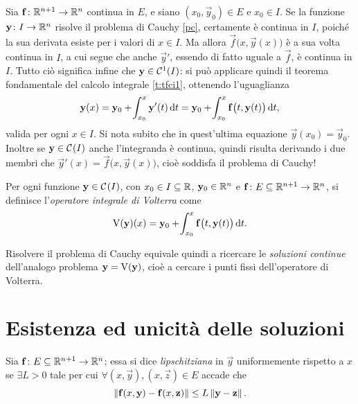 Sia $\mathbf{f}\colon\mathbb{R}^{n+1}\to\mathbb{R}^n$ continua in $E$, e siano $(x_0,\vec y_0)\in E$ e $x_0\in I$. Se la funzione $\mathbf{y}\colon I\to\mathbb{R}^n$ risolve il problema di Cauchy \eqref{pc}, certamente è continua in $I$, poiché la sua derivata esiste per i valori di $x\in I$. Ma allora $\vec f\big(x,\vec y(x)\big)$ è a sua volta continua in $I$, a cui segue che anche $\vec y'$, essendo di fatto uguale a $\vec f$, è continua in $I$. Tutto ciò significa infine che $\mathbf{y}\in\mathcal{C}^{{1}}(I)$: si può applicare quindi il teorema fondamentale del calcolo integrale \ref{t:tfci1}, ottenendo l'uguaglianza
\begin{equation}
\mathbf{y}(x)=\mathbf{y}_0+\!\int_{x_0}^x\mathbf{y}'(t)\,\textup{d} t=\mathbf{y}_0+\!\int_{x_0}^x\mathbf{f}\big(t,\mathbf{y}(t)\big)\,\textup{d} t,
\end{equation}
valida per ogni $x\in I$.
Si nota subito che in quest'ultima equazione $\vec y(x_0)=\vec y_0$. Inoltre se $\mathbf{y}\in\mathcal{C}^{{}}(I)$ anche l'integranda è continua, quindi risulta derivando i due membri che $\vec y'(x)=\vec f\big(x,\vec y(x)\big)$, cioè soddisfa il problema di Cauchy!

\begin{definizione} \label{d:volterra}
Per ogni funzione $\mathbf{y}\in\mathcal{C}^{{}}(I)$, con $x_0\in I\subseteq\mathbb{R}$, $\mathbf{y}_0\in\mathbb{R}^n$ e $\mathbf{f}\colon E\subseteq\mathbb{R}^{n+1}\to\mathbb{R}^n$, si definisce l'\emph{operatore integrale di Volterra} come
\begin{equation} \label{vol}
\operatorname{V}(\mathbf{y})(x)=\mathbf{y}_0+\!\int_{x_0}^x\mathbf{f}\big(t,\mathbf{y}(t)\big)\,\textup{d} t.
\end{equation}
\end{definizione}
Risolvere il problema di Cauchy equivale quindi a ricercare le \emph{soluzioni continue} dell'analogo problema $\mathbf{y}=\operatorname{V}(\mathbf{y})$, cioè a cercare i punti fissi dell'operatore di Volterra.

\section{Esistenza ed unicità delle soluzioni}
\begin{definizione} \label{d:lipsy}
Sia $\mathbf{f}\colon E\subseteq\mathbb{R}^{n+1}\to\mathbb{R}^n$; essa si dice \emph{lipschitziana} in $\vec y$ uniformemente rispetto a $x$ se $\exists L>0$ tale per cui $\forall(x,\vec y),(x,\vec z)\in E$ accade che
\begin{equation}
\left\|{\mathbf{f}(x,\mathbf{y})-\mathbf{f}(x,\mathbf{z})}\right\|\leq L\left\|{\mathbf{y}-\mathbf{z}}\right\|.
\end{equation}
\end{definizione}
